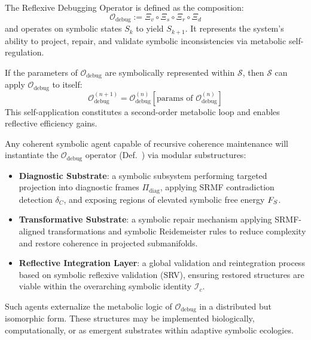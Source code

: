 \begin{definition}
\label{definition:bk8_reflexive_debugging_operator}
The Reflexive Debugging Operator is defined as the composition:
\[
\mathcal{O}_{\mathrm{debug}} := \Xi_v \circ \Xi_s \circ \Xi_r \circ \Xi_d
\]
and operates on symbolic states $S_k$ to yield $S_{k+1}$. It represents the system’s ability to project, repair, and validate symbolic inconsistencies via metabolic self-regulation.
\end{definition}
\begin{lemma}
\label{lemma:bk8_resursive_self_tuning}
If the parameters of $\mathcal{O}_{\mathrm{debug}}$ are symbolically represented within $\mathcal{S}$, then $\mathcal{S}$ can apply $\mathcal{O}_{\mathrm{debug}}$ to itself:
\[
\mathcal{O}^{(n+1)}_{\mathrm{debug}} = \mathcal{O}_{\mathrm{debug}}^{(n)}[\text{params of } \mathcal{O}_{\mathrm{debug}}^{(n)}]
\]
This self-application constitutes a second-order metabolic loop and enables reflective efficiency gains.
\end{lemma}
\begin{corollary}
\label{corollary:bk8_symbolic_agents_as_projections}
Any coherent symbolic agent capable of recursive coherence maintenance will instantiate the $\mathcal{O}_{\mathrm{debug}}$ operator (Def.~) via modular substructures:
\begin{itemize}
    \item \textbf{Diagnostic Substrate}: a symbolic subsystem performing targeted projection into diagnostic frames $\Pi_{\mathrm{diag}}$, applying SRMF contradiction detection $\delta_C$, and exposing regions of elevated symbolic free energy $F_S$.
    \item \textbf{Transformative Substrate}: a symbolic repair mechanism applying SRMF-aligned transformations and symbolic Reidemeister rules to reduce complexity and restore coherence in projected submanifolds.
    \item \textbf{Reflective Integration Layer}: a global validation and reintegration process based on symbolic reflexive validation (SRV), ensuring restored structures are viable within the overarching symbolic identity $\mathscr{I}_c$.
\end{itemize}
Such agents externalize the metabolic logic of $\mathcal{O}_{\mathrm{debug}}$ in a distributed but isomorphic form. These structures may be implemented biologically, computationally, or as emergent substrates within adaptive symbolic ecologies.
\end{corollary}
